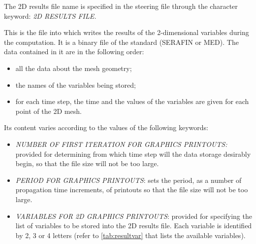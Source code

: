 The 2D results file name is specified in the steering file through the character
keyword: \textit{2D RESULTS FILE.}

This is the file into which \tomawac writes the results of the 2-dimensional variables
during the computation. It is a binary file of the \telemac standard (SERAFIN or MED).
The data contained in it are in the following order:

\begin{itemize}
\item  all the data about the mesh geometry;
\item  the names of the variables being stored;
\item  for each time step, the time and the values of the variables are given for each
  point of the 2D mesh.
\end{itemize}

 Its content varies according to the values of the following keywords:

\begin{itemize}
\item  \textit{NUMBER OF FIRST ITERATION FOR GRAPHICS PRINTOUTS:} provided for
  determining from which time step will the data storage desirably begin, so that
  the file size will not be too large.
\item  \textit{PERIOD FOR GRAPHICS PRINTOUTS}: sets the period, as a number of
  propagation time increments, of printouts so that the file size will not be too large.
\item  \textit{VARIABLES FOR 2D GRAPHICS PRINTOUTS}: provided for specifying the
  list of variables to be stored into the 2D results file. Each variable is identified
  by 2, 3 or 4 letters (refer to \ref{tab:resultvar} that lists the available variables).
\end{itemize}

